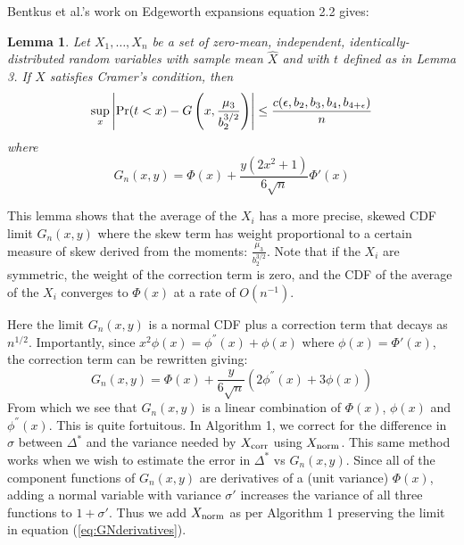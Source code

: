 \documentclass{article}
\newtheorem{lemma}{Lemma}
\begin{document}
Bentkus et al.'s work on Edgeworth
expansions \cite{Bentkus97} equation 2.2 gives:

\begin{lemma} Let $X_1,\ldots,X_n$ be
  a set of zero-mean, independent, identically-distributed random variables with sample mean $\hat{X}$ and with $t$ defined as in Lemma 3. If $X$ satisfies Cramer's condition, 
then
\begin{equation}\label{eq:clt-bounds}
 \sup_x\left|{\rm Pr}(t<x) - G\left(x, \frac{\mu_3}{b_2^{3/2}}\right)\right| \leq \frac{c(\epsilon,b_2,b_3,b_4,b_{4+\epsilon})}{n}
\end{equation}
where
\begin{equation}
G_n(x,y) = \Phi(x) + \frac{y(2x^2+1)}{6\sqrt{n}}\Phi'(x)
\end{equation}
\end{lemma}
This lemma shows that the average of the $X_i$ has a more precise, skewed CDF limit $G_n(x,y)$
where the skew term has weight proportional to a certain measure of skew derived
from the moments: $\frac{\mu_3}{b_2^{3/2}}$. Note that if the $X_i$ are symmetric,
the weight of the correction term is zero, and the CDF of the average of the $X_i$ converges
to $\Phi(x)$ at a rate of $O(n^{-1})$.

Here the limit $G_n(x,y)$ is a normal CDF plus a correction term that
decays as $n^{1/2}$. Importantly, since $x^2\phi(x) = \phi^{''}(x) + \phi(x)$ where $\phi(x)=\Phi'(x)$, the correction term can be rewritten giving:
\begin{equation}
  \label{eq:GNderivatives}
G_n(x,y) = \Phi(x) + \frac{y}{6\sqrt{n}}(2\phi^{''}(x)+3\phi(x))
\end{equation}
From which we see that $G_n(x,y)$ is a linear combination of
$\Phi(x)$, $\phi(x)$ and $\phi^{''}(x)$. This is quite fortuitous. In
Algorithm 1, we correct for the difference in $\sigma$ between
$\Delta^*$ and the variance needed by $X_{\rm corr}$ using $X_{\rm
  norm}$. This same method works when we wish to estimate the error in $\Delta^*$ vs
$G_n(x,y)$. Since all of the component functions of $G_n(x,y)$ are
derivatives of a (unit variance) $\Phi(x)$, adding a normal variable
with variance $\sigma'$ increases the variance of all three functions
to $1+\sigma'$. Thus we add $X_{\rm norm}$ as per Algorithm 1
preserving the limit in equation (\ref{eq:GNderivatives}).
\end{document}
